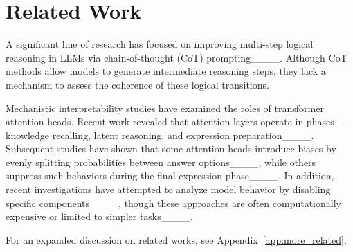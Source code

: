 \section{Related Work}
\label{sec:related}
A significant line of research has focused on improving multi-step logical reasoning in LLMs via chain-of-thought (CoT) prompting____. Although CoT methods allow models to generate intermediate reasoning steps, they lack a  mechanism to assess the  coherence of these logical transitions.



Mechanistic interpretability studies have examined the roles of transformer attention heads. Recent work revealed that attention layers operate in phases—knowledge recalling, latent reasoning, and expression preparation____. Subsequent studies have shown that some attention heads introduce biases by evenly splitting probabilities between answer options____, while others suppress such behaviors during the final expression phase____. In addition, recent investigations have attempted to analyze model behavior by disabling specific components____, though these approaches are often computationally expensive or limited to simpler tasks____.


For an expanded discussion on related works, see Appendix~\ref{app:more_related}.